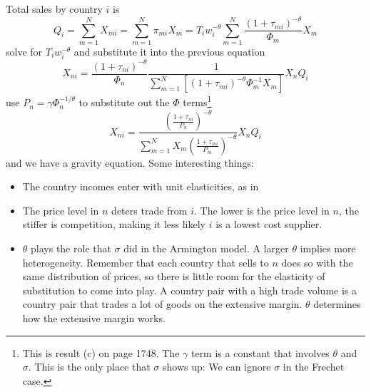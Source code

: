\documentclass[11pt, pdftex]{article}
\begin{document}
Total sales by country $i$ is
\begin{equation}
    Q_i = \sum_{m=1}^N X_{mi} = \sum_{m=1}^N \pi_{mi}X_{m}  = T_i w_i^{-\theta} \sum_{m=1}^N \frac{(1+\tau_{mi})^{-\theta}}{\Phi_m}X_m
\end{equation}
solve for $T_iw_i^{-\theta}$ and substitute it into the previous equation
\begin{equation}
    X_{ni}= \frac{\left(1+\tau_{ni}\right)^{-\theta} }{\Phi_n}\frac{1}{\sum_{m=1}^N\left[(1+\tau_{mi})^{-\theta}\Phi_m^{-1}X_m\right]} X_nQ_i
\end{equation}
use $P_n=\gamma\Phi_n^{-1/\theta}$ to substitute out the $\Phi$ terms\footnote{This is result (c) on page 1748.  The $\gamma$ term is a constant that involves $\theta$ and $\sigma$.  This is the only place that $\sigma$ shows up: We can ignore $\sigma$ in the Frechet case.}
\begin{equation}
    X_{ni}= \frac{ \left(\frac{1+\tau_{ni} }{P_n}\right)^{-\theta}} { \sum_{m=1}^NX_m\left(\frac{1+\tau_{mi}}{P_m}\right)^{-\theta}} X_nQ_i
\end{equation}
and we have a gravity equation.  Some interesting things:
\begin{itemize}
  \item The country incomes enter with unit elasticities, as in \citet{andersonVanwin}
  \item The price level in $n$ deters trade from $i$.  The lower is the price level in $n$, the stiffer is competition, making it less likely $i$ is a lowest cost supplier.
  \item $\theta$ plays the role that $\sigma$ did in the Armington model.  A larger $\theta$ implies more heterogeneity. Remember that each country that sells to $n$ does so with the same distribution of prices, so there is little room for the elasticity of substitution to come into play. A country pair with a high trade volume is a country pair that trades a lot of goods on the extensive margin. $\theta$ determines how the extensive margin works.
\end{itemize}
\end{document}
